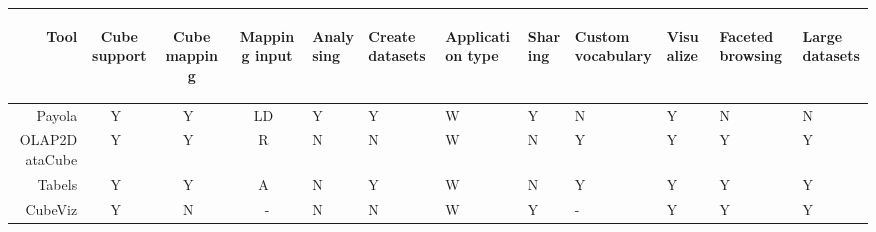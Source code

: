 \begin{tabularx}{\textwidth}{ |r|C|C|C|X|X|X|X|X|X|X|X| }
  \hline
      \begin{sideways}Tool\end{sideways} & 
      \centering\begin{sideways}Cube support\end{sideways} &
      \centering\begin{sideways}Cube mapping\end{sideways} &
      \centering\begin{sideways}Mapping input\end{sideways} &
      \centering\begin{sideways}Analysing\end{sideways} &
      \centering\begin{sideways}Create datasets\end{sideways} &
      \centering\begin{sideways}Application type\end{sideways} &
      \centering\begin{sideways}Sharing\end{sideways} &
      \centering\begin{sideways}Custom vocabulary\end{sideways} &
      \centering\begin{sideways}Visualize\end{sideways} &
      \centering\begin{sideways}Faceted browsing\end{sideways} &
      \begin{sideways}Large datasets\end{sideways}\\ \hline
  \hline
  Payola                   & Y~& Y~& LD~& Y~& Y~& W~& Y~& N~& Y~& N~& N~\\ \hline
  OLAP2DataCube    & Y~& Y~& R~ & N~& N~& W~& N~& Y~& Y~& Y~& Y~\\ \hline
  Tabels                   & Y~& Y~& A~ & N~& Y~& W~& N~& Y~& Y~& Y~& Y~\\ \hline
  CubeViz                & Y~& N~& -  & N~& N~& W~& Y~& - & Y~& Y~& Y~\\ \hline \hline 
  

\end{tabularx}
